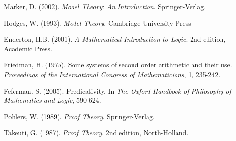 \documentclass[12pt]{article}
\theoremstyle{plain}
\theoremstyle{definition}
\begin{document}
\begin{thebibliography}{99}
 Marker, D. (2002). \emph{Model Theory: An Introduction}. Springer-Verlag.

 Hodges, W. (1993). \emph{Model Theory}. Cambridge University Press.

 Enderton, H.B. (2001). \emph{A Mathematical Introduction to Logic}. 2nd edition, Academic Press.

 Friedman, H. (1975). Some systems of second order arithmetic and their use. \emph{Proceedings of the International Congress of Mathematicians}, 1, 235-242.

 Feferman, S. (2005). Predicativity. In \emph{The Oxford Handbook of Philosophy of Mathematics and Logic}, 590-624.

 Pohlers, W. (1989). \emph{Proof Theory}. Springer-Verlag.

 Takeuti, G. (1987). \emph{Proof Theory}. 2nd edition, North-Holland.

\end{thebibliography}
\end{document}
